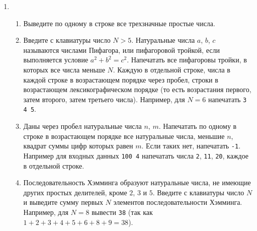 \documentclass{article}
\begin{document}
\begin{enumerate}[label={}, leftmargin=0pt, itemindent=0pt]
\begin{enumerate}[label=\arabic{enumi}.\arabic*.]
\end{enumerate}
\hrulefill

\item
\begin{enumerate}[label=\arabic{enumi}.\arabic*.]
\item 
Выведите по одному в строке все трехзначные простые числа.
\item 
Введите с клавиатуры число $N>5$. Натуральные числа $a$, $b$, $c$ называются числами Пифагора, или пифагоровой тройкой, если выполняется условие $a^2+b^2=c^2$. Напечатать все пифагоровы тройки, в которых все числа меньше $N$. Каждую в отдельной строке, числа в каждой строке в возрастающем порядке через пробел, строки в возрастающем лексикографическом порядке
(то есть возрастания первого, затем второго, затем третьего числа). Например, для $N=6$ напечатать \texttt{3 4 5}.
\item 
Даны через пробел натуральные числа $n$, $m$. Напечатать по одному в строке в возрастающем порядке все натуральные числа, меньшие $n$, квадрат суммы цифр которых равен $m$.
Если таких нет, напечатать \texttt{-1}. Например для входных данных \texttt{100 4} напечатать числа \texttt{2}, \texttt{11}, \texttt{20}, каждое в отдельной строке.
\item
Последовательность Хэмминга образуют натуральные числа, не имеющие других простых делителей, кроме $2$, $3$ и $5$. Введите с клавиатуры число $N$ и выведите сумму первых $N$ элементов последовательности Хэмминга. Например, для $N=8$ вывести \texttt{38} (так как $1+2+3+4+5+6+8+9=38$).
\end{enumerate}

\end{enumerate}
\end{document}
